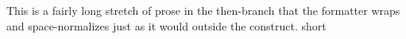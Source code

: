 \ifdraft
This is a fairly long stretch of prose in the then-branch that the formatter
wraps and space-normalizes just as it would outside the construct.
\else
short
\fi
